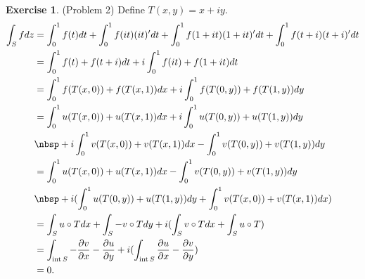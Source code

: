 \documentclass[12pt, psamsfonts]{amsart}
\theoremstyle{definition}
\newtheorem*{exer}{Exercise}
\theoremstyle{remark}
\DeclareMathOperator{\Int}{int}
\numberwithin{equation}{section}
\begin{document}
\begin{exer}{(Problem 2)}
  Define $T(x, y) = x + iy$.
  \begin{align*}
    \int_{S} fdz
      &= \int_{0}^{1} f(t)dt + \int_{0}^{1} f(it)(it)'dt + \int_{0}^{1} f(1 + it)(1 + it)'dt + \int_{0}^{1} f(t + i)(t + i)'dt \\
      &= \int_{0}^{1} f(t) + f(t + i)dt + i\int_{0}^{1} f(it) + f(1 + it) dt \\
      &= \int_{0}^{1} f(T(x, 0)) + f(T(x, 1)) dx + i\int_{0}^{1} f(T(0, y)) + f(T(1, y)) dy \\
      &= \int_{0}^{1} u(T(x, 0)) + u(T(x, 1)) dx + i\int_{0}^{1} u(T(0, y)) + u(T(1, y)) dy  \\
      &\nbsp + i\int_{0}^{1} v(T(x, 0)) + v(T(x, 1)) dx - \int_{0}^{1} v(T(0, y)) + v(T(1, y)) dy \\
      &= \int_{0}^{1} u(T(x, 0)) + u(T(x, 1)) dx - \int_{0}^{1} v(T(0, y)) + v(T(1, y)) dy \\
      &\nbsp + i(\int_{0}^{1} u(T(0, y)) + u(T(1, y)) dy + \int_{0}^{1} v(T(x, 0)) + v(T(x, 1)) dx) \\
      &= \int_{S} u \circ T dx + \int_{S} -v \circ T dy + i(\int_{S} v \circ T dx + \int_{S} u \circ T) \\
      &= \int_{\Int S} -\frac{\partial v}{\partial x} - \frac{\partial u}{\partial y} + i(\int_{\Int S} \frac{\partial u}{\partial x} - \frac{\partial v}{\partial y}) \\
      &= 0.
  \end{align*}

\end{exer}
\end{document}
